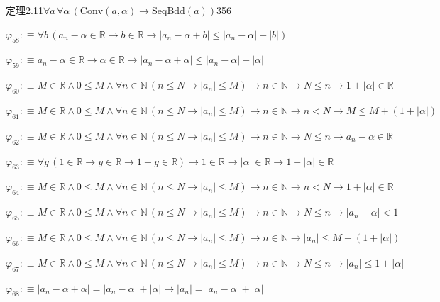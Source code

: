 \begin{fullproof}{定理2.11}{$\forall a\,\forall \alpha\,(\mathrm{Conv}(a,\alpha) \to \mathrm{SeqBdd}(a))$}{356}
\begin{abbrevlist}
\item $\varphi_{58} :\equiv \forall b\,(a_{n} - \alpha \in \mathbb{R} \to b \in \mathbb{R} \to \lvert a_{n} - \alpha + b \rvert \leq \lvert a_{n} - \alpha \rvert + \lvert b \rvert)$
\item $\varphi_{59} :\equiv a_{n} - \alpha \in \mathbb{R} \to \alpha \in \mathbb{R} \to \lvert a_{n} - \alpha + \alpha \rvert \leq \lvert a_{n} - \alpha \rvert + \lvert \alpha \rvert$
\item $\varphi_{60} :\equiv M \in \mathbb{R} \land 0 \leq M \land \forall n \in \mathbb{N}\,(n \leq N \to \lvert a_{n} \rvert \leq M) \to n \in \mathbb{N} \to N \leq n \to 1 + \lvert \alpha \rvert \in \mathbb{R}$
\item $\varphi_{61} :\equiv M \in \mathbb{R} \land 0 \leq M \land \forall n \in \mathbb{N}\,(n \leq N \to \lvert a_{n} \rvert \leq M) \to n \in \mathbb{N} \to n < N \to M \leq M + (1 + \lvert \alpha \rvert)$
\item $\varphi_{62} :\equiv M \in \mathbb{R} \land 0 \leq M \land \forall n \in \mathbb{N}\,(n \leq N \to \lvert a_{n} \rvert \leq M) \to n \in \mathbb{N} \to N \leq n \to a_{n} - \alpha \in \mathbb{R}$
\item $\varphi_{63} :\equiv \forall y\,(1 \in \mathbb{R} \to y \in \mathbb{R} \to 1 + y \in \mathbb{R}) \to 1 \in \mathbb{R} \to \lvert \alpha \rvert \in \mathbb{R} \to 1 + \lvert \alpha \rvert \in \mathbb{R}$
\item $\varphi_{64} :\equiv M \in \mathbb{R} \land 0 \leq M \land \forall n \in \mathbb{N}\,(n \leq N \to \lvert a_{n} \rvert \leq M) \to n \in \mathbb{N} \to n < N \to 1 + \lvert \alpha \rvert \in \mathbb{R}$
\item $\varphi_{65} :\equiv M \in \mathbb{R} \land 0 \leq M \land \forall n \in \mathbb{N}\,(n \leq N \to \lvert a_{n} \rvert \leq M) \to n \in \mathbb{N} \to N \leq n \to \lvert a_{n} - \alpha \rvert < 1$
\item $\varphi_{66} :\equiv M \in \mathbb{R} \land 0 \leq M \land \forall n \in \mathbb{N}\,(n \leq N \to \lvert a_{n} \rvert \leq M) \to n \in \mathbb{N} \to \lvert a_{n} \rvert \leq M + (1 + \lvert \alpha \rvert)$
\item $\varphi_{67} :\equiv M \in \mathbb{R} \land 0 \leq M \land \forall n \in \mathbb{N}\,(n \leq N \to \lvert a_{n} \rvert \leq M) \to n \in \mathbb{N} \to N \leq n \to \lvert a_{n} \rvert \leq 1 + \lvert \alpha \rvert$
\item $\varphi_{68} :\equiv \lvert a_{n} - \alpha + \alpha \rvert = \lvert a_{n} - \alpha \rvert + \lvert \alpha \rvert \to \lvert a_{n} \rvert = \lvert a_{n} - \alpha \rvert + \lvert \alpha \rvert$

\end{abbrevlist}
\end{fullproof}
